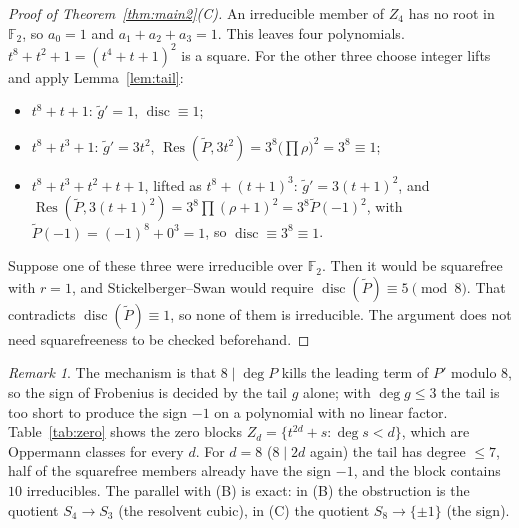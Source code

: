 \documentclass[11pt,a4paper]{amsart}
\theoremstyle{definition}
\theoremstyle{remark}
\newtheorem{remark}[theorem]{Remark}
\newcommand{\F}{\mathbb{F}}
\newcommand{\disc}{\operatorname{disc}}
\newcommand{\Res}{\operatorname{Res}}
\begin{document}
\begin{proof}[Proof of Theorem~\ref{thm:main2}(C)]
An irreducible member of $Z_4$ has no root in $\F_2$, so $a_0=1$ and $a_1+a_2+a_3=1$. This leaves four polynomials.
$t^8+t^2+1=(t^4+t+1)^2$ is a square. For the other three choose integer lifts and apply Lemma~\ref{lem:tail}:
\begin{itemize}
\item $t^8+t+1$: $\tilde g'=1$, $\disc\equiv1$;
\item $t^8+t^3+1$: $\tilde g'=3t^2$, $\Res(\tilde P,3t^2)=3^8\big(\prod\rho\big)^2=3^8\equiv1$;
\item $t^8+t^3+t^2+t+1$, lifted as $t^8+(t+1)^3$: $\tilde g'=3(t+1)^2$, and
$\Res(\tilde P,3(t+1)^2)=3^8\prod(\rho+1)^2=3^8\tilde P(-1)^2$, with $\tilde P(-1)=(-1)^8+0^3=1$, so
$\disc\equiv3^8\equiv1$.
\end{itemize}
Suppose one of these three were irreducible over $\F_2$. Then it would be squarefree with $r=1$, and
Stickelberger--Swan would require $\disc(\tilde P)\equiv5\pmod8$. That contradicts $\disc(\tilde P)\equiv1$, so none of
them is irreducible. The argument does not need squarefreeness to be checked beforehand.
\end{proof}

\begin{remark}
The mechanism is that $8\mid\deg P$ kills the leading term of $P'$ modulo $8$, so the sign of Frobenius is decided by
the tail $g$ alone; with $\deg g\le3$ the tail is too short to produce the sign $-1$ on a polynomial with no linear
factor. Table~\ref{tab:zero} shows the zero blocks $Z_d=\{t^{2d}+s:\deg s<d\}$, which are Oppermann classes for every
$d$. For $d=8$ ($8\mid 2d$ again) the tail has degree $\le7$, half of the squarefree members already have the sign
$-1$, and the block contains $10$ irreducibles. The parallel with (B) is exact: in (B) the obstruction is the
quotient $S_4\to S_3$ (the resolvent cubic), in (C) the quotient $S_8\to\{\pm1\}$ (the sign).
\end{remark}
\end{document}
